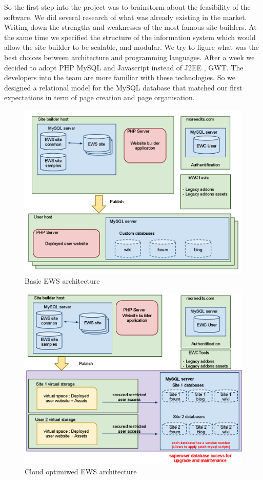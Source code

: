 So the first step into the project was to brainstorm about the feasibility of the software. We did several research of what was already existing in the market. Writing down the strengths and weaknesses of the most famous site builders. At the same time we specified the structure of the information system which would allow the site builder to be scalable, and modular. We try to figure what was the best choices between architecture and programming languages. After a week we decided to adopt PHP MySQL and Javascript instead of J2EE , GWT. The developers into the team are more familiar with these technologies. So we designed a relational model for the MySQL database that matched our first expectations in term of page creation and page organisation.

\begin{figure}[!ht]
\centering
\includegraphics[width=.55\textwidth]{img/ews_archi_before.png}
\caption{Basic EWS architecture }
\label{figure:ews_archi_before}
\end{figure}

\begin{figure}[!ht]
\centering
\includegraphics[width=.55\textwidth]{img/ews_archi_after.png}
\caption{Cloud optimiwed EWS architecture }
\label{figure:ews_archi_after}
\end{figure}

